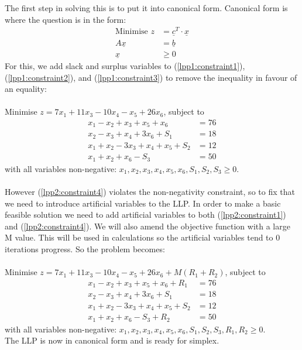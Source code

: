 \documentclass{article}
\numberwithin{equation}{section}
\begin{document}
The first step in solving this is to put it into canonical form. Canonical form is where the question is in the form:
\begin{align}
    \text{Minimise }z &= \underline{c}^T \cdot \underline{x} \\
    A\underline{x} &= \underline{b} \\
    \underline{x} &\geq 0
\end{align}
For this, we add slack and surplus variables to (\ref{lpp1:constraint1}), (\ref{lpp1:constraint2}), and (\ref{lpp1:constraint3}) to remove the inequality in favour of an equality: \\ \\
Minimise $z = 7x_1 + 11x_3 - 10x_4 - x_5 + 26x_6$, subject to
\begin{align}
    x_1 - x_2 + x_3 + x_5 + x_6 &= 76 \label{lpp2:constraint1} \\
    x_2 - x_3 + x_4 + 3x_6 + S_1 &= 18 \label{lpp2:constraint2} \\
    x_1 + x_2 - 3x_3 + x_4 + x_5 + S_2 &= 12 \label{lpp2:constraint3} \\
    x_1 + x_2 + x_6 - S_3&= 50 \label{lpp2:constraint4}
\end{align}
with all variables non-negative: $x_1, x_2, x_3, x_4, x_5, x_6, S_1, S_2, S_3\geq 0$.\\ \\
However (\ref{lpp2:constraint4}) violates the non-negativity constraint, so to fix that we need to introduce artificial variables to the LLP. In order to make a basic feasible solution we need to add artificial variables to both (\ref{lpp2:constraint1}) and (\ref{lpp2:constraint4}). We will also amend the objective function with a large M value. This will be used in calculations so the artificial variables tend to 0 iterations progress. So the problem becomes: \\ \\
Minimise $z = 7x_1 + 11x_3 - 10x_4 - x_5 + 26x_6 + M(R_1 + R_2)$, subject to
\begin{align}
    x_1 - x_2 + x_3 + x_5 + x_6 + R_1&= 76 \\
    x_2 - x_3 + x_4 + 3x_6 + S_1 &= 18 \\
    x_1 + x_2 - 3x_3 + x_4 + x_5 + S_2 &= 12 \\
    x_1 + x_2 + x_6 - S_3 +R_2 &= 50
\end{align}
with all variables non-negative: $x_1, x_2, x_3, x_4, x_5, x_6, S_1, S_2, S_3, R_1, R_2\geq 0$.\\
\newpage
The LLP is now in canonical form and is ready for simplex.
\end{document}
